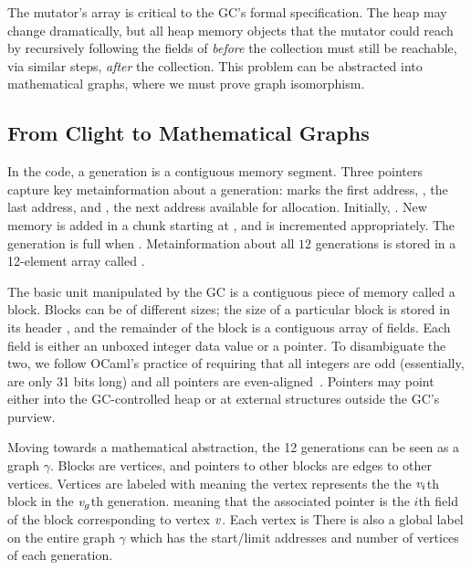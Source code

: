 The mutator's  array is critical to the GC's formal specification.
The heap may change dramatically, but all heap memory objects 
that the mutator could reach by recursively
following the fields of  \emph{before} the collection 
must still be reachable, via similar steps, \emph{after} the collection.  This problem can be abstracted 
into mathematical graphs, where we must prove graph isomorphism.

\subsection{From Clight to Mathematical Graphs}
\label{sec:movetomathgraph}
In the code, a generation is a contiguous memory segment. 
Three pointers capture key metainformation about a generation:
 marks the first address, ,
the last address, and , the next address available for 
allocation.  
Initially, . 
New memory is added in a chunk starting 
at , and  is
incremented appropriately. 
The generation is full when .
Metainformation about all $12$ generations is stored in 
a 12-element array called .
	
The basic unit manipulated by the GC is a
contiguous piece of memory called a block. Blocks can be of different sizes;
the size of a particular block is stored in its
header , and the remainder of the block is a contiguous array of fields.
Each field is either an unboxed integer data value or a pointer. 
To disambiguate the two,
we follow OCaml's practice of requiring that all integers are odd 
(essentially, are only 31 bits long) and all pointers are even-aligned~\cite{realworldocaml}. Pointers may point either into the GC-controlled heap or at external structures outside the GC's purview.

Moving towards a mathematical abstraction, the 12 generations can be seen
as a graph $\gamma$. Blocks are
vertices, and pointers to other blocks are edges to other
vertices. Vertices are labeled with
 meaning the vertex represents the 
the $\mathit{v}_i$th block in the $\mathit{v}_g$th generation. 
 meaning that 
the associated pointer is the $i$th field of the block
corresponding to vertex $\mathit{v}$. 
Each vertex is  There is also a global label on the entire graph $\gamma$ which has the
start/limit addresses and number of vertices of each generation. 

